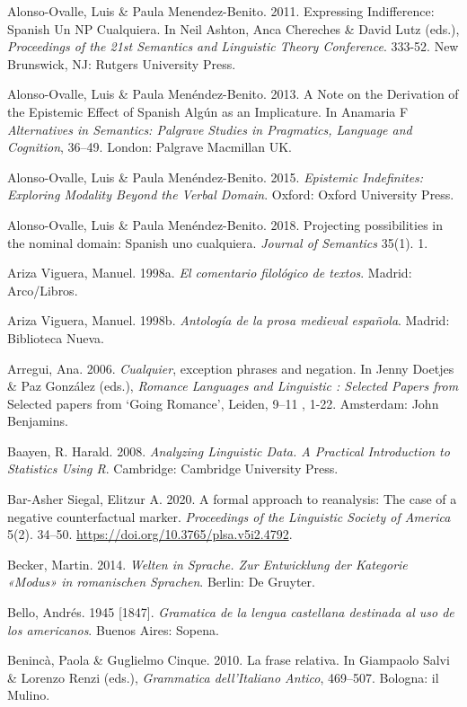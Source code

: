 \documentclass[output=paper]{langscibook}
\begin{document}
Alonso-Ovalle, Luis \& Paula Menendez-Benito. 2011. Expressing Indifference: Spanish Un NP Cualquiera. In Neil Ashton, Anca Chereches \& David Lutz (eds.), \textit{Proceedings of the 21st Semantics and Linguistic Theory Conference}. 333-52. New Brunswick, NJ: Rutgers University Press.

Alonso-Ovalle, Luis \& Paula Menéndez-Benito. 2013. A Note on the Derivation of the Epistemic Effect of Spanish Algún as an Implicature. In Anamaria F \textit{Alternatives in Semantics: Palgrave Studies in Pragmatics, Language and Cognition}, 36–49. London: Palgrave Macmillan UK.

Alonso-Ovalle, Luis \& Paula Menéndez-Benito. 2015. \textit{Epistemic Indefinites: Exploring Modality Beyond the Verbal Domain}. Oxford: Oxford University Press.

Alonso-Ovalle, Luis \& Paula Menéndez-Benito. 2018. Projecting possibilities in the nominal domain: Spanish uno cualquiera. \textit{Journal of Semantics} 35(1). 1.

Ariza Viguera, Manuel. 1998a. \textit{El comentario filológico de textos}. Madrid: Arco/Libros.

Ariza Viguera, Manuel. 1998b. \textit{Antología de la prosa medieval española}. Madrid: Biblioteca Nueva.

Arregui, Ana. 2006. \textit{Cualquier}, exception phrases and negation. In Jenny Doetjes \& Paz González (eds.), \textit{Romance Languages and Linguistic \citealt{Theory2004}: Selected Papers from} Selected papers from ‘Going Romance’, Leiden, 9–11 \citealt{December2004}, 1-22. Amsterdam: John Benjamins.

Baayen, R. Harald. 2008. \textit{Analyzing Linguistic Data. A Practical Introduction to Statistics Using R}. Cambridge: Cambridge University Press. 

Bar-Asher Siegal, Elitzur A. 2020. A formal approach to reanalysis: The case of a negative counterfactual marker. \textit{Proceedings of the Linguistic Society of America} 5(2). 34–50. \url{https://doi.org/10.3765/plsa.v5i2.4792}.

Becker, Martin. 2014. \textit{Welten in Sprache. Zur Entwicklung der Kategorie «Modus» in romanischen Sprachen}. Berlin: De Gruyter.

Bello, Andrés. 1945 [1847]. \textit{Gramatica de la lengua castellana destinada al uso de los americanos}. Buenos Aires: Sopena.

Benincà, Paola \& Guglielmo Cinque. 2010. La frase relativa. In Giampaolo Salvi \& Lorenzo Renzi (eds.), \textit{Grammatica dell’Italiano Antico}, 469–507. Bologna: il Mulino.
\end{document}
